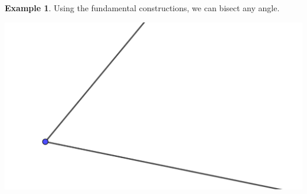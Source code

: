\documentclass[11pt]{article}
\theoremstyle{definition}
\newtheorem{example}[theorem]{Example}
\begin{document}
\begin{example}
  Using the fundamental constructions, we can bisect any angle. 
  \begin{center}
    \includegraphics[scale=.75]{bisect_angle_1.png}
  \end{center}


\end{example}
\end{document}
